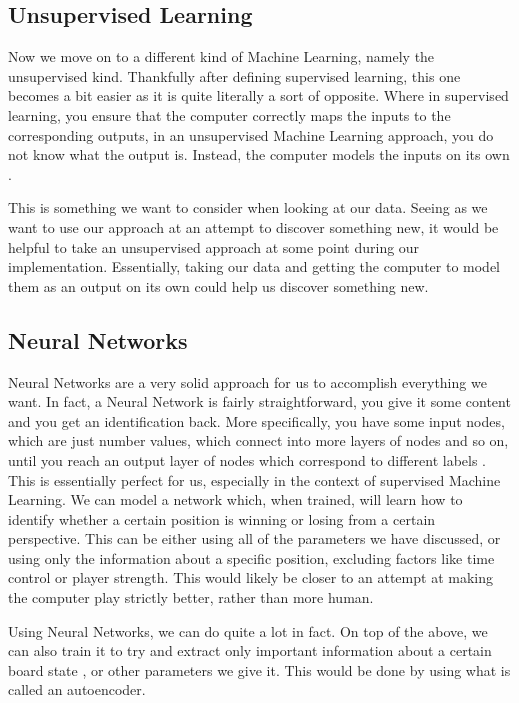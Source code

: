 \documentclass[12pt]{article}
\begin{document}
    \subsection{Unsupervised Learning}

    Now we move on to a different kind of Machine Learning, namely the unsupervised kind. Thankfully after defining supervised learning, this one becomes a bit easier as it is quite literally a sort of opposite. Where in supervised learning, you ensure that the computer correctly maps the inputs to the corresponding outputs, in an unsupervised Machine Learning approach, you do not know what the output is. Instead, the computer models the inputs on its own \cite{mltypes_book}.

    This is something we want to consider when looking at our data. Seeing as we want to use our approach at an attempt to discover something new, it would be helpful to take an unsupervised approach at some point during our implementation. Essentially, taking our data and getting the computer to model them as an output on its own could help us discover something new.

    \subsection{Neural Networks}

    Neural Networks are a very solid approach for us to accomplish everything we want. In fact, a Neural Network is fairly straightforward, you give it some content and you get an identification back. More specifically, you have some input nodes, which are just number values, which connect into more layers of nodes and so on, until you reach an output layer of nodes which correspond to different labels \cite{nn_models_theory_projects}. This is essentially perfect for us, especially in the context of supervised Machine Learning. We can model a network which, when trained, will learn how to identify whether a certain position is winning or losing from a certain perspective. This can be either using all of the parameters we have discussed, or using only the information about a specific position, excluding factors like time control or player strength. This would likely be closer to an attempt at making the computer play strictly better, rather than more human.

    Using Neural Networks, we can do quite a lot in fact. On top of the above, we can also train it to try and extract only important information about a certain board state \cite{deepchess}, or other parameters we give it. This would be done by using what is called an autoencoder.
\end{document}
